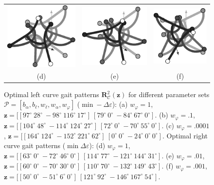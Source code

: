 \documentclass[10pt,a4paper]{article}
\begin{document}
\begin{figure}
\begin{center}
\begin{tabular}{ccc}
\includegraphics[scale=1]{../Pics/py/U-turn_f_ori_1.pdf}&
\includegraphics[scale=1]{../Pics/py/U-turn_f_ori_01.pdf}&
\includegraphics[scale=1]{../Pics/py/U-turn_f_ori_0001.pdf} \\
(d) & (e) & (f)\\
\end{tabular}
\caption{
Optimal left curve gait patterns $\bm{R}_\mathcal{C}^2(\bm{z})$ for different parameter sets $\mathcal{P} = [b_\alpha, b_\ell, w_\ell, w_\alpha, w_\varphi]$ ($\min -\Delta\varepsilon$):
(a) $w_\varphi = 1$, $\bm{z}=[[97^\circ~28^\circ~-98^\circ~116^\circ~17^\circ]~[79^\circ~0^\circ~-84^\circ~67^\circ~0^\circ]$.
(b) $w_\varphi = .1$, $\bm{z}=[[104^\circ~48^\circ~-114^\circ~124^\circ~27^\circ]~[72^\circ~0^\circ~-70^\circ~55^\circ~0^\circ]$.
(c) $w_\varphi = .0001$, $\bm{z}=[[164^\circ~124^\circ~-152^\circ~221^\circ~62^\circ]~[0^\circ~0^\circ~-24^\circ~0^\circ~0^\circ]$.
Optimal right curve gait patterns ($\min \Delta\varepsilon$):
(d) $w_\varphi = 1$, $\bm{z}=[[63^\circ~0^\circ~-72^\circ~46^\circ~0^\circ]~[114^\circ~77^\circ~-121^\circ~144^\circ~31^\circ]$.
(e) $w_\varphi = .01$, $\bm{z}=[[60^\circ~0^\circ~-70^\circ~30^\circ~0^\circ]~[110^\circ~70^\circ~-132^\circ~149^\circ~43^\circ]$.
(f) $w_\varphi = .001$,  $\bm{z}=[[50^\circ~0^\circ~-51^\circ~6^\circ~0^\circ]~[121^\circ~92^\circ~-146^\circ~167^\circ~54^\circ]$.
}
\label{fig:opt_curve_gait}
\end{center}
\end{figure}
\end{document}
